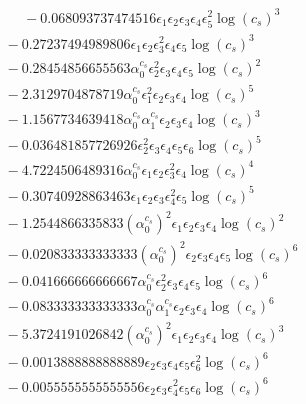 \documentclass[10pt]{article}
\begin{document}
\begin{align*}
\phantom{F_{s,6}} &\phantom{={}}{}  - 0.068093737474516 \epsilon_{1} \epsilon_{2} \epsilon_{3} \epsilon_{4} \epsilon_{5}^{2} \log{\left(c_{s} \right)}^{3} \\
&{}  - 0.27237494989806 \epsilon_{1} \epsilon_{2} \epsilon_{3}^{2} \epsilon_{4} \epsilon_{5} \log{\left(c_{s} \right)}^{3} \\
&{}  - 0.28454856655563 \alpha_{0}^{c_s} \epsilon_{2}^{2} \epsilon_{3} \epsilon_{4} \epsilon_{5} \log{\left(c_{s} \right)}^{2} \\
&{}  - 2.3129704878719 \alpha_{0}^{c_s} \epsilon_{1}^{2} \epsilon_{2} \epsilon_{3} \epsilon_{4} \log{\left(c_{s} \right)}^{5} \\
&{}  - 1.1567734639418 \alpha_{0}^{c_s} \alpha_{1}^{c_s} \epsilon_{2} \epsilon_{3} \epsilon_{4} \log{\left(c_{s} \right)}^{3} \\
&{}  - 0.036481857726926 \epsilon_{2}^{2} \epsilon_{3} \epsilon_{4} \epsilon_{5} \epsilon_{6} \log{\left(c_{s} \right)}^{5} \\
&{}  - 4.7224506489316 \alpha_{0}^{c_s} \epsilon_{1} \epsilon_{2} \epsilon_{3}^{2} \epsilon_{4} \log{\left(c_{s} \right)}^{4} \\
&{}  - 0.30740928863463 \epsilon_{1} \epsilon_{2} \epsilon_{3} \epsilon_{4}^{2} \epsilon_{5} \log{\left(c_{s} \right)}^{5} \\
&{}  - 1.2544866335833 \left(\alpha_{0}^{c_s}\right)^{2} \epsilon_{1} \epsilon_{2} \epsilon_{3} \epsilon_{4} \log{\left(c_{s} \right)}^{2} \\
&{}  - 0.020833333333333 \left(\alpha_{0}^{c_s}\right)^{2} \epsilon_{2} \epsilon_{3} \epsilon_{4} \epsilon_{5} \log{\left(c_{s} \right)}^{6} \\
&{}  - 0.041666666666667 \alpha_{0}^{c_s} \epsilon_{2}^{2} \epsilon_{3} \epsilon_{4} \epsilon_{5} \log{\left(c_{s} \right)}^{6} \\
&{}  - 0.083333333333333 \alpha_{0}^{c_s} \alpha_{1}^{c_s} \epsilon_{2} \epsilon_{3} \epsilon_{4} \log{\left(c_{s} \right)}^{6} \\
&{}  - 5.3724191026842 \left(\alpha_{0}^{c_s}\right)^{2} \epsilon_{1} \epsilon_{2} \epsilon_{3} \epsilon_{4} \log{\left(c_{s} \right)}^{3} \\
&{}  - 0.0013888888888889 \epsilon_{2} \epsilon_{3} \epsilon_{4} \epsilon_{5} \epsilon_{6}^{2} \log{\left(c_{s} \right)}^{6} \\
&{}  - 0.0055555555555556 \epsilon_{2} \epsilon_{3} \epsilon_{4}^{2} \epsilon_{5} \epsilon_{6} \log{\left(c_{s} \right)}^{6} \\

\end{align*}
\end{document}

